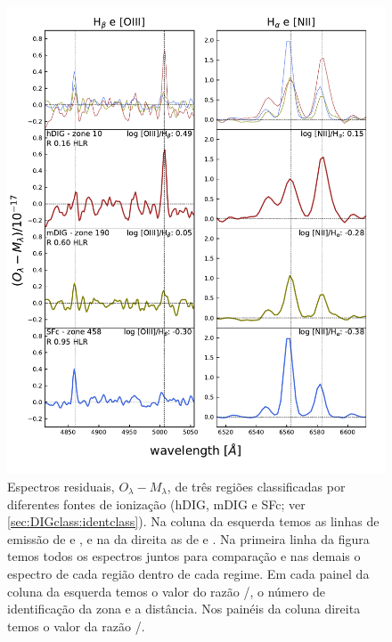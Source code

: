 \begin{figure}
\includegraphics[scale=0.8]{figuras/K0010_spectra_examples_classes.pdf}
 \caption[Espectros hDIG, mDIG e SFc da galáxia K0010]
 {Espectros residuais, $O_\lambda - M_\lambda$, de três regiões classificadas por diferentes fontes de ionização (hDIG, mDIG e SFc; ver \ref{sec:DIGclass:identclass}). Na coluna da esquerda temos as linhas de emissão de \Hb e \Oiii, e na da direita as de \Ha e \Nii. Na primeira linha da figura temos todos os espectros juntos para comparação e nas demais o espectro de cada região dentro de cada regime. Em cada painel da coluna da esquerda temos o valor do razão \oiii/\Hb, o número de identificação da zona e a distância. Nos painéis da coluna direita temos o valor da razão \nii/\Ha.}
 \label{fig:ExampleSpectra}
\end{figure}

